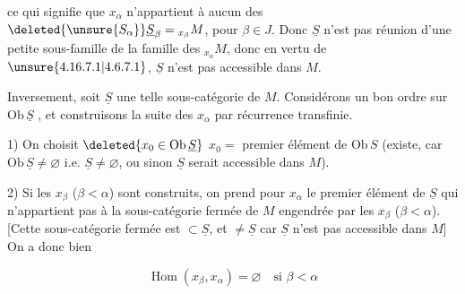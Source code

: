 


ce qui signifie que $x_\alpha$ n'appartient à aucun des $\deleted{\unsure{S_{\alpha}}}\underline S_\beta={}_{x_\beta}M$, pour $\beta\in J$. Donc $\underline S$ n'est pas réunion d'une petite sous-famille de la famille des $ {}_{x_\alpha}M$, donc en vertu de $\unsure{4.16.7.1|4.6.7.1}$, $\underline S$ n'est pas accessible dans $M$.

Inversement, soit $\underline S$ une telle sous-catégorie de $M$. Considérons un bon ordre sur $\mathrm{Ob}\,\underline S$ , et construisons la suite des $x_\alpha$  par récurrence transfinie.


1) On choisit $\deleted{x_0\in\mathrm{Ob}\,\underline S}$ $x_0={}$ premier élément de $\mathrm{Ob}\,S$ (existe, car $\mathrm{Ob}\,\underline S\ne\varnothing$ i.e. $\underline S\ne\varnothing$, ou sinon $\underline S$ serait accessible dans $M$).

2) Si les $x_\beta$ ($\beta<\alpha$) sont construits, on prend pour $x_\alpha$ le premier élément de $\underline S$  qui n'appartient pas à la sous-catégorie fermée de $M$ engendrée par les $x_\beta$ ($\beta<\alpha$). [Cette sous-catégorie fermée est $\subset\underline S$, et $\ne\underline S$ car $\underline S$ n'est pas accessible dans $M$] On a donc bien

\[
\operatorname{Hom}(x_\beta,x_\alpha)=\varnothing\quad\text{si }\beta<\alpha
\]


